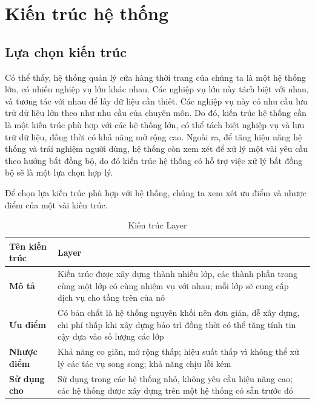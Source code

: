 
\section{Kiến trúc hệ thống}
\subsection{Lựa chọn kiến trúc}

\hspace*{0.5cm}Có thể thấy, hệ thống quản lý cửa hàng thời trang của chúng ta là một hệ thống lớn, có nhiều nghiệp vụ lớn khác nhau. Các nghiệp vụ lớn này tách biệt với nhau, và tương tác với nhau để lấy dữ liệu cần thiết. Các nghiệp vụ này có nhu cầu lưu trữ dữ liệu lớn theo như nhu cầu của chuyên môn. Do đó, kiến trúc hệ thống cần là một kiến trúc phù hợp với các hệ thống lớn, có thể tách biệt nghiệp vụ và lưu trữ dữ liệu, đồng thời có khả năng mở rộng cao. Ngoài ra, để tăng hiệu năng hệ thống và trải nghiệm người dùng, hệ thống còn xem xét để xử lý một vài yêu cầu theo hướng bất đồng bộ, do đó kiến trúc hệ thống có hỗ trợ việc xử lý bất đồng bộ sẽ là một lựa chọn hợp lý.

Để chọn lựa kiến trúc phù hợp với hệ thống, chúng ta xem xét ưu điểm và nhược điểm của một vài kiến trúc.\\

\begin{table}[h]
	\begin{tabular}{|p{3cm}|p{12cm}|}
		\hline
		\textbf{Tên kiến trúc} & Layer                                                                                                                                                        \\
		\hline
		\textbf{Mô tả}         & Kiến trúc được xây dựng thành nhiều lớp, các thành phần trong cùng một lớp có cùng nhiệm vụ với nhau; mỗi lớp sẽ cung cấp dịch vụ cho tầng trên của nó       \\
		\hline
		\textbf{Ưu điểm}       & Có bản chất là hệ thống nguyên khối nên đơn giản, dễ xây dựng, chi phí thấp khi xây dựng bảo trì đồng thời có thể tăng tính tin cậy dựa vào số lượng các lớp \\
		\hline
		\textbf{Nhược điểm}    & Khả năng co giãn, mở rộng thấp; hiệu suất thấp vì không thể xử lý các tác vụ song song; khả năng chịu lỗi kém                                                \\
		\hline
		\textbf{Sử dụng cho}   & Sử dụng trong các hệ thống nhỏ, không yêu cầu hiệu năng cao; các hệ thống được xây dựng trên một hệ thống có sẵn trước đó                                    \\
		\hline
	\end{tabular}
	\caption{Kiến trúc Layer}
\end{table}

